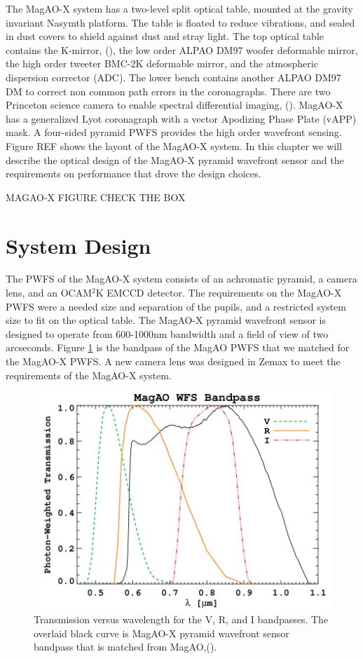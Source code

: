 The MagAO-X system has a two-level split optical table, mounted at the gravity invariant Nasymth platform. The table is floated to reduce vibrations, and sealed in dust covers to shield against dust and stray light. The top optical table contains the K-mirror, (\cite{hedglen2018optical}), the low order ALPAO DM97 woofer deformable mirror, the high order tweeter BMC-2K deformable mirror, and the atmospheric dispersion corrector (ADC). The lower bench contains another ALPAO DM97 DM to correct non common path errors in the coronagraphs. There are two Princeton science camera to enable spectral differential imaging, (\cite{biller_sdi}). MagAO-X has a generalized Lyot coronagraph with a vector Apodizing Phase Plate (vAPP) mask. A four-sided pyramid PWFS provides the high order wavefront sensing. Figure REF shows the layout of the MagAO-X system. In this chapter we will describe the optical design of the MagAO-X pyramid wavefront sensor and the requirements on performance that drove the design choices. 

MAGAO-X FIGURE CHECK THE BOX

\section{System Design}

The PWFS of the MagAO-X system consists of an achromatic pyramid, a camera lens, and an OCAM$^2$K EMCCD detector. The requirements on the MagAO-X PWFS were a needed size and separation of the pupils, and a restricted system size to fit on the optical table. The MagAO-X pyramid wavefront sensor is designed to operate from 600-1000nm bandwidth and a field of view of two arcseconds. Figure \ref{fig:bandpass} is the bandpass of the MagAO PWFS that we matched for the MagAO-X PWFS. A new camera lens was designed in Zemax to meet the requirements of the MagAO-X system. 
	
	
\begin{figure}[h]
	\centering
	\includegraphics[width=.5\textwidth]{Chapter Materials/Chapter Three Materials/MagAOBandpass_updated.jpg}
	\caption{Transmission versus wavelength for the V, R, and I bandpasses. The overlaid black curve is MagAO-X pyramid wavefront sensor bandpass that is matched from MagAO,(\cite{morzinski2014magao}).}
	\label{fig:bandpass}
\end{figure}
	
